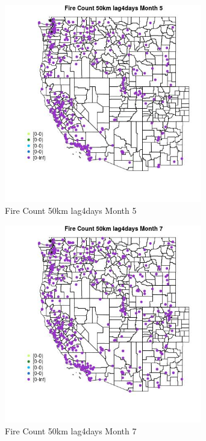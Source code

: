 \begin{figure} 
\centering  
\includegraphics[width=0.77\textwidth]{Code_Outputs/Report_ML_input_PM25_Step4_part_e_de_duplicated_aves_compiled_2019-05-18wNAs_MapObsMo5Fire_Count_50km_lag4days.jpg} 
\caption{\label{fig:Report_ML_input_PM25_Step4_part_e_de_duplicated_aves_compiled_2019-05-18wNAsMapObsMo5Fire_Count_50km_lag4days}Fire Count 50km lag4days Month 5} 
\end{figure} 
 

\clearpage 

\begin{figure} 
\centering  
\includegraphics[width=0.77\textwidth]{Code_Outputs/Report_ML_input_PM25_Step4_part_e_de_duplicated_aves_compiled_2019-05-18wNAs_MapObsMo7Fire_Count_50km_lag4days.jpg} 
\caption{\label{fig:Report_ML_input_PM25_Step4_part_e_de_duplicated_aves_compiled_2019-05-18wNAsMapObsMo7Fire_Count_50km_lag4days}Fire Count 50km lag4days Month 7} 
\end{figure} 
 

